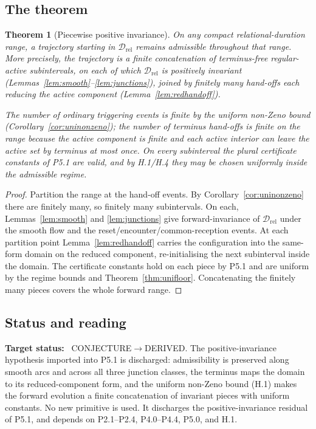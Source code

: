 \documentclass[11pt,a4paper]{article}
\newcommand{\stDerived}{\textcolor{cDer}{\textsf{\small DERIVED}}}
\newcommand{\stConj}{\textcolor{cCon}{\textsf{\small CONJECTURE}}}
\theoremstyle{definition}
\theoremstyle{plain}
\newtheorem{theorem}[definition]{Theorem}
\theoremstyle{remark}
\begin{document}
\subsection{The theorem}

\begin{theorem}[Piecewise positive invariance]\label{thm:invariance}
On any compact relational-duration range, a trajectory starting in \(\mathcal D_{\mathrm{rel}}\)
remains admissible throughout that range. More precisely, the trajectory is a finite
concatenation of terminus-free regular-active subintervals, on each of which
\(\mathcal D_{\mathrm{rel}}\) is positively invariant
(Lemmas~\ref{lem:smooth}--\ref{lem:junctions}), joined by finitely many hand-offs each
reducing the active component (Lemma~\ref{lem:redhandoff}).

The number of ordinary triggering events is finite by the uniform non-Zeno bound
(Corollary~\ref{cor:uninonzeno}); the number of terminus hand-offs is finite on the range
because the active component is finite and each active interior can leave the active set by
terminus at most once. On every subinterval the plural certificate constants of P5.1 are
valid, and by H.1/H.4 they may be chosen uniformly inside the admissible regime.
\end{theorem}

\begin{proof}
Partition the range at the hand-off events. By Corollary~\ref{cor:uninonzeno} there are
finitely many, so finitely many subintervals. On each, Lemmas~\ref{lem:smooth} and
\ref{lem:junctions} give forward-invariance of \(\mathcal D_{\mathrm{rel}}\) under the smooth
flow and the reset/encounter/common-reception events. At each partition point
Lemma~\ref{lem:redhandoff} carries the configuration into the same-form domain on the reduced
component, re-initialising the next subinterval inside the domain. The certificate constants
hold on each piece by P5.1 and are uniform by the regime bounds and Theorem~\ref{thm:unifloor}.
Concatenating the finitely many pieces covers the whole forward range. \qedhere
\end{proof}

\subsection{Status and reading}

\textbf{Target status:}~
\stConj\(\to\)\stDerived. The positive-invariance hypothesis imported into P5.1 is discharged:
admissibility is preserved along smooth arcs and across all three junction classes, the
terminus maps the domain to its reduced-component form, and the uniform non-Zeno bound (H.1)
makes the forward evolution a finite concatenation of invariant pieces with uniform constants.
No new primitive is used. It discharges the positive-invariance residual of P5.1, and depends
on P2.1--P2.4, P4.0--P4.4, P5.0, and H.1.
\end{document}
